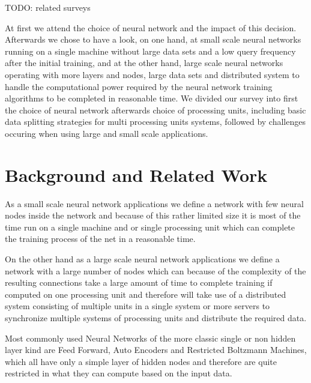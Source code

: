 \documentclass[conference]{IEEEtran}
\begin{document}
TODO: related surveys

 At first we attend the choice of neural network and the impact of this decision. Afterwards we chose to have a look, on one hand, at small scale neural networks running on a single machine without large data sets and a low query frequency after the initial training, and at the other hand, large scale neural networks operating with more layers and nodes, large data sets and distributed system to handle the computational power required by the neural network training algorithms to be completed in reasonable time. We divided our survey into first the choice of neural network afterwards choice of processing units, including basic data splitting strategies for multi processing units systems, followed by challenges occuring when using large and small scale applications.



\section{Background and Related Work}


As a small scale neural network applications we define a network with few neural nodes inside the network and because of this rather limited size it is most of the time run on a single machine and or single processing unit which can complete the training process of the net in a reasonable time.



On the other hand as a large scale neural network applications we define a network with a large number of nodes which can because of the complexity of the resulting connections take a large amount of time to complete training if computed on one processing unit and therefore will take use of a distributed system consisting of multiple units in a single system or more servers to synchronize multiple systems of processing units and distribute the required data.



Most commonly used Neural Networks of the more classic single or non hidden layer kind are Feed Forward, Auto Encoders and Restricted Boltzmann Machines, which all have only a simple layer of hidden nodes and therefore are quite restricted in what they can compute based on the input data. 
\end{document}
